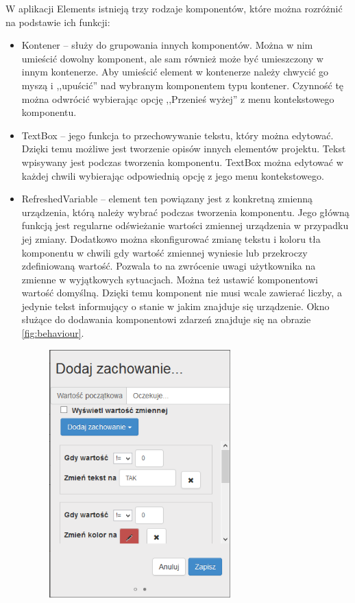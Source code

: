 W aplikacji Elements istnieją trzy rodzaje komponentów, które można rozróżnić na podstawie ich funkcji:
\begin{itemize}
	\item Kontener – służy do grupowania innych komponentów. Można w nim umieścić dowolny komponent, ale sam również może być umieszczony w innym kontenerze. Aby umieścić element w kontenerze należy chwycić go myszą i ,,upuścić'' nad wybranym komponentem typu kontener. Czynność tę można odwrócić wybierając opcję ,,Przenieś wyżej'' z menu kontekstowego komponentu.
	\item TextBox – jego funkcja to przechowywanie tekstu, który można edytować. Dzięki temu możliwe jest tworzenie opisów innych elementów projektu. Tekst wpisywany jest podczas tworzenia komponentu. TextBox można edytować w każdej chwili wybierając odpowiednią opcję z jego menu kontekstowego.
	\item RefreshedVariable – element ten powiązany jest z konkretną zmienną urządzenia, którą należy wybrać podczas tworzenia komponentu. Jego główną funkcją jest regularne odświeżanie wartości zmiennej urządzenia w przypadku jej zmiany. Dodatkowo można skonfigurować zmianę tekstu i koloru tła komponentu w chwili gdy wartość zmiennej wyniesie lub przekroczy zdefiniowaną wartość. Pozwala to na zwrócenie uwagi użytkownika na zmienne w wyjątkowych sytuacjach. Można też ustawić komponentowi wartość domyślną. Dzięki temu komponent nie musi wcale zawierać liczby, a jedynie tekst informujący o stanie w jakim znajduje się urządzenie. Okno służące do dodawania komponentowi zdarzeń znajduje się na obrazie \ref{fig:behaviour}. 
	\begin{figure}[h]
	\centerline{
		\includegraphics[width=70mm]{./img/screen/designer_zmiennazachowanie.png}
}
\end{figure}
\end{itemize}
